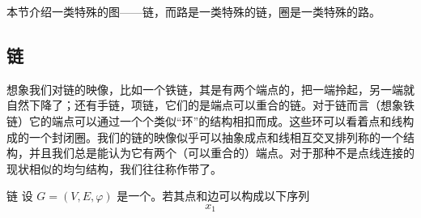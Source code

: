 
本节介绍一类特殊的图——链，而路是一类特殊的链，圈是一类特殊的路。

\subsection{链}
想象我们对链的映像，比如一个铁链，其是有两个端点的，把一端拎起，另一端就自然下降了；还有手链，项链，它们的是端点可以重合的链。对于链而言（想象铁链）它的端点可以通过一个个类似“环”的结构相扣而成。这些环可以看着点和线构成的一个封闭圈。我们的链的映像似乎可以抽象成点和线相互交叉排列称的一个结构，并且我们总是能认为它有两个（可以重合的）端点。对于那种不是点线连接的现状相似的均匀结构，我们往往称作带了。

\begin{definition}{链}
设 $G=(V,E,\varphi)$ 是一个。若其点和边可以构成以下序列
\begin{equation}
x_1
\end{equation}

\end{definition}














